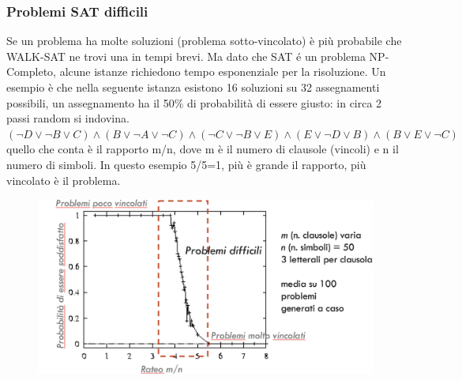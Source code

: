 \documentclass{article}
\begin{document}
\subsubsection{Problemi SAT difficili}
Se un problema ha molte soluzioni (problema sotto-vincolato) è più probabile che WALK-SAT ne trovi una in tempi brevi. Ma dato che SAT é un problema NP-Completo, alcune istanze richiedono tempo esponenziale per la risoluzione.
Un esempio è che nella seguente istanza esistono 16 soluzioni su 32 assegnamenti possibili, un assegnamento ha il 50\% di probabilità di essere giusto: in circa 2 passi random si indovina. \newline 
$(\neg D \lor \neg B \lor C) \land (B \lor \neg A \lor \neg C) \land (\neg C \lor \neg B \lor E) \land (E \lor \neg D \lor B) \land (B \lor E \lor \neg C)$ \newline quello che conta è il rapporto m/n, dove m è il numero di clausole (vincoli) e n il numero di simboli. In questo esempio 5/5=1, più è grande il rapporto, più vincolato è il problema.
\begin{figure}[H]
\centering
\includegraphics[scale=0.4]{Images/rateomn.png}
\end{figure}
\end{document}
